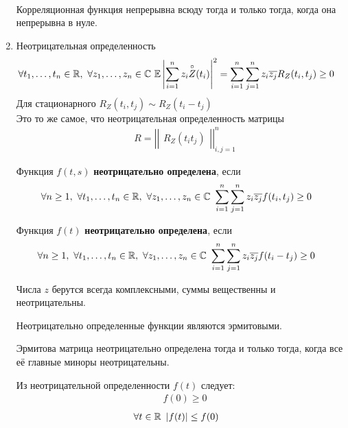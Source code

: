 \begin{enumerate}
\begin{align*}
    \end{align*}
    Корреляционная функция непрерывна всюду тогда и только тогда, когда она
    непрерывна в нуле.
    \item Неотрицательная определенность
    \begin{align*}
      & \forall  t_1, \dots, t_n \in \mathbb{R}, \ \forall z_1, \dots, z_n \in \mathbb{C} \ \mathbb{E}\left| \sum_{i=1}^nz_i\overset{\circ}{Z}(t_i) \right|^2 = \sum_{i=1}^n\sum_{j=1}^nz_i\overline{z_j}R_Z(t_i,t_j) \geq 0
    \end{align*}
    Для стационарного $R_Z(t_i, t_j) \sim R_Z(t_i-t_j)$
    \\
    Это то же самое, что неотрицательная определенность матрицы
    \begin{align*}
      & R = \left| \left| \begin{matrix} R_Z(t_it_j) \end{matrix} \right| \right|_{i,j=1}^n
    \end{align*}
    \begin{Def}
        Функция $f(t,s)$ \textbf{неотрицательно определена}, если
        \begin{align*}
          & \forall n \geq 1, \ \forall  t_1, \dots, t_n \in \RR, \ \forall z_1, \dots, z_n \in \CC \ \sum_{i=1}^n\sum_{j=1}^nz_i\oL{z_j}f(t_i,t_j) \geq 0
        \end{align*}
    \end{Def}
    \begin{Def}
        Функция $f(t)$ \textbf{неотрицательно определена}, если
        \begin{align*}
          & \forall n \geq 1, \ \forall  t_1, \dots, t_n \in \RR, \ \forall z_1, \dots, z_n \in \CC \ \sum_{i=1}^n\sum_{j=1}^nz_i\oL{z_j}f(t_i-t_j) \geq 0
        \end{align*}
    \end{Def}
    \begin{Note}
        Числа $z$ берутся всегда комплексными, суммы вещественны и неотрицательны.
    \end{Note}
    \begin{Note}
        Неотрицательно определенные функции являются эрмитовыми.
    \end{Note}
    \begin{Note}
        Эрмитова матрица неотрицательно определена тогда и только тогда, когда все
        её главные миноры неотрицательны.
    \end{Note}
    \begin{Note}
        Из неотрицательной определенности $f(t)$ следует:
        \begin{align*}
          & f(0) \geq 0
        \end{align*}
        \begin{align*}
          & \forall t \in \mathbb{R} \ \left| f(t) \right| \leq f(0)
        \end{align*}
    \end{Note}
\end{enumerate}
